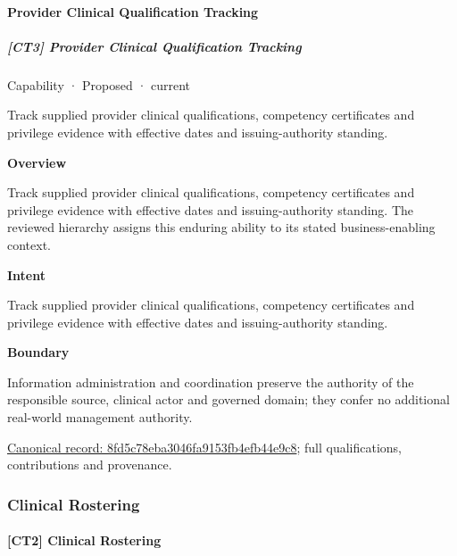 \paragraph{Provider Clinical Qualification Tracking}

\subparagraph{[CT3] Provider Clinical Qualification Tracking}

\label{element:8fd5c78eba3046fa9153fb4efb44e9c8}
{\small Capability · Proposed · current}\par

Track supplied provider clinical qualifications, competency certificates and privilege evidence with effective dates and issuing-authority standing.



\textbf{Overview}



Track supplied provider clinical qualifications, competency certificates and privilege evidence with effective dates and issuing-authority standing. The reviewed hierarchy assigns this enduring ability to its stated business-enabling context.



\textbf{Intent}



Track supplied provider clinical qualifications, competency certificates and privilege evidence with effective dates and issuing-authority standing.



\textbf{Boundary}



Information administration and coordination preserve the authority of the responsible source, clinical actor and governed domain; they confer no additional real-world management authority.


{\footnotesize \href{../../../../continuum/strategy/capability/8fd5c78eba3046fa9153fb4efb44e9c8.md}{Canonical record: 8fd5c78eba3046fa9153fb4efb44e9c8}; full qualifications, contributions and provenance.}\par
\subsubsection{Clinical Rostering}

\paragraph{[CT2] Clinical Rostering}

